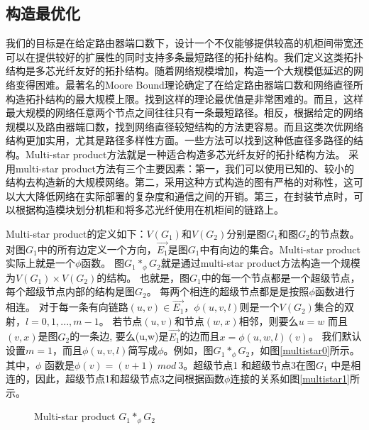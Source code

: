 \subsection{构造最优化}

我们的目标是在给定路由器端口数下，设计一个不仅能够提供较高的机柜间带宽还可以在提供较好的扩展性的同时支持多条最短路径的拓扑结构。我们定义这类拓扑结构是多芯光纤友好的拓扑结构。随着网络规模增加，构造一个大规模低延迟的网络变得困难。最著名的Moore Bound理论确定了在给定路由器端口数和网络直径所构造拓扑结构的最大规模上限。找到这样的理论最优值是非常困难的。而且，这样最大规模的网络任意两个节点之间往往只有一条最短路径。相反，根据给定的网络规模以及路由器端口数，找到网络直径较短结构的方法更容易。而且这类次优网络结构更加实用，尤其是路径多样性方面。一些方法可以找到这种低直径多路径的结构。Multi-star product方法就是一种适合构造多芯光纤友好的拓扑结构方法。 采用multi-star product方法有三个主要因素：第一，我们可以使用已知的、较小的结构去构造新的大规模网络。第二，采用这种方式构造的图有严格的对称性，这可以大大降低网络在实际部署的复杂度和通信之间的开销。第三，在封装节点时，可以根据构造模块划分机柜和将多芯光纤使用在机柜间的链路上。

Multi-star product的定义如下：$V(G_{1})$和$V(G_{2})$分别是图$G_{1}$和图$G_{2}$的节点数。
对图$G_{1}$中的所有边定义一个方向，$\vec{E_{1}}$是图$G_{1}$中有向边的集合。Multi-star product实际上就是一个$\phi$函数。
图$G_{1}*_{\phi} G_{2}$就是通过multi-star product方法构造一个规模为$V(G_{1})\times V(G_{2})$的结构。
也就是，图$G_{1}$中的每一个节点都是一个超级节点，每个超级节点内部的结构是图$G_{2}$。
 每两个相连的超级节点都是是按照$\phi$函数进行相连。
 对于每一条有向链路$(u,v)\in \vec{E_{1}}$，$\phi(u,v,l)$则是一个$V(G_{2})$集合的双射，$l=0,1,...,m-1$。
 若节点$(u,v)$和节点$(w,x)$相邻，则要么$u=w$ 而且$(v,x)$是图$G_{2}$的一条边, 要么(u,w)是$\vec{E_{1}}$的边而且$x=\phi(u,w,l)(v)$。
 我们默认设置$m=1$，而且$\phi(u,v,l)$简写成$\phi$。例如，图$G_{1}*_{\phi} G_{2}$，如图\ref{multistar0}所示。
 其中，$\phi$ 函数是$\phi(v)=(v+1)\ mod\ 3$。超级节点1 和超级节点3在图$G_{1}$ 中是相连的，因此，超级节点1和超级节点3之间根据函数$\phi$连接的关系如图\ref{multistar1}所示。

   \begin{figure}[t]
   \begin{minipage}[t]{\textwidth}
   \centering
   \vspace{2em}
  \vspace{-.3cm}
  \caption{Multi-star product $G_{1}*_{\phi} G_{2}$}
  \label{multistar01}
  \end{minipage}

   \end{figure}

